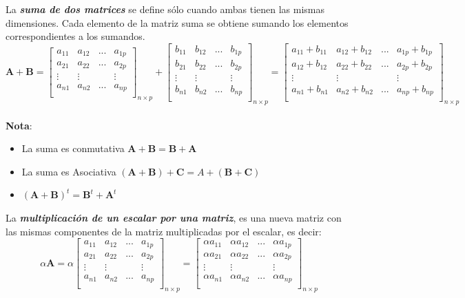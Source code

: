 \documentclass[12pt,letterpaper]{report} %
\begin{document}
La \textit{\textbf{suma de dos matrices}} se define sólo cuando ambas tienen las mismas dimensiones. Cada elemento de la matriz suma se obtiene sumando los elementos correspondientes a los sumandos.
$$
\mathbf{A}+\mathbf{B}=
\begin{bmatrix}
a_{11} & a_{12} & ... & a_{1p} \\
a_{21} & a_{22} & ... & a_{2p} \\
\vdots & \vdots &     & \vdots \\
a_{n1} & a_{n2} & ... & a_{np} \\
\end{bmatrix}_{n\times p}
+
\begin{bmatrix}
b_{11} & b_{12} & ... & b_{1p} \\
b_{21} & b_{22} & ... & b_{2p} \\
\vdots & \vdots &     & \vdots \\
b_{n1} & b_{n2} & ... & b_{np} \\
\end{bmatrix}_{n\times p}
=
\begin{bmatrix}
a_{11}+b_{11} & a_{12}+b_{12} & ... & a_{1p}+b_{1p} \\
a_{12}+b_{12} & a_{22}+b_{22} & ... & a_{2p}+b_{2p} \\
\vdots & \vdots &     & \vdots \\
a_{n1}+b_{n1} & a_{n2}+b_{n2} & ... & a_{np}+b_{np} \\
\end{bmatrix}_{n\times p}
$$
\\
\textbf{Nota}:
\begin{itemize}
\item La suma es conmutativa $\mathbf{A}+\mathbf{B}=\mathbf{B}+\mathbf{A}$
\item La suma es Asociativa $(\mathbf{A}+\mathbf{B})+\mathbf{C}=A+(\mathbf{B}+\mathbf{C})$
\item $(\mathbf{A}+\mathbf{B})^t=\mathbf{B}^t+\mathbf{A}^t$
\end{itemize}

La \textit{\textbf{multiplicación de un escalar por una matriz}}, es una nueva matriz con las mismas componentes de la matriz multiplicadas por el escalar, es decir:
$$
\alpha \mathbf{A}=
\alpha\begin{bmatrix}
a_{11} & a_{12} & ... & a_{1p} \\
a_{21} & a_{22} & ... & a_{2p} \\
\vdots & \vdots &     & \vdots \\
a_{n1} & a_{n2} & ... & a_{np} \\
\end{bmatrix}_{n\times p}
=
\begin{bmatrix}
\alpha a_{11} & \alpha a_{12} & ... & \alpha a_{1p} \\
\alpha a_{21} & \alpha a_{22} & ... & \alpha a_{2p} \\
\vdots & \vdots &     & \vdots \\
\alpha a_{n1} & \alpha a_{n2} & ... & \alpha a_{np} \\
\end{bmatrix}_{n\times p}
$$
\\
\end{document}
